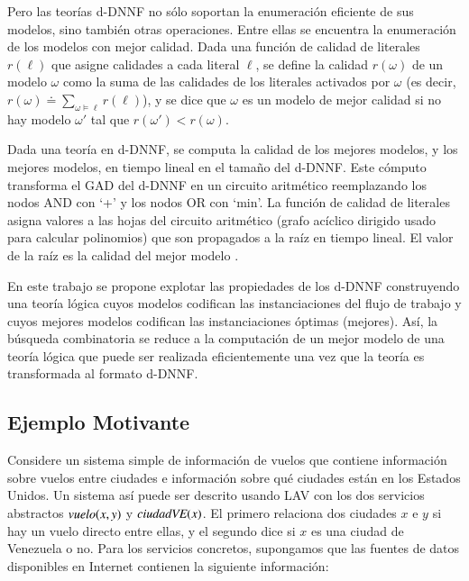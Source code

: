 Pero las teorías d-DNNF no sólo soportan la enumeración eficiente de sus
modelos, sino también otras operaciones. Entre ellas se encuentra la enumeración
de los modelos con mejor calidad. Dada una función de calidad de literales
$r(\ell)$ que asigne calidades a cada literal $\ell$, se define la calidad
$r(\omega)$ de un modelo $\omega$ como la suma de las calidades de los literales
activados por $\omega$ (es decir,
$r(\omega)\doteq\sum_{\omega\vDash\ell}r(\ell)$), y se dice que $\omega$ es un modelo
de mejor calidad si no hay modelo $\omega'$ tal que $r(\omega')<r(\omega)$.

Dada una teoría en d-DNNF, se computa la calidad de los mejores modelos, y
los mejores modelos, en tiempo lineal en el tamaño del d-DNNF. Este cómputo
transforma el GAD del d-DNNF en un circuito aritmético reemplazando los nodos
AND con `+' y los nodos OR con `min'. La función de calidad de literales
asigna valores a las hojas del circuito aritmético (grafo acíclico dirigido usado
para calcular polinomios) que son propagados a la raíz en tiempo
lineal. El valor de la raíz es la calidad del mejor modelo \cite{darwiche:weighted}.

En este trabajo se propone explotar las propiedades de los d-DNNF construyendo una
teoría lógica cuyos modelos codifican las instanciaciones del flujo de trabajo
y cuyos mejores modelos codifican las instanciaciones óptimas (mejores). Así, la
búsqueda combinatoria se reduce a la computación de un mejor modelo de una
teoría lógica que puede ser realizada eficientemente una vez que la teoría es
transformada al formato d-DNNF.

\subsection{Ejemplo Motivante}

\newcommand{\vuelo}{\text{\it vuelo}}
\newcommand{\ciudadVE}{\text{\it ciudadVE}}
\newcommand{\nacional}{\text{\it nacional}}
\newcommand{\ida}{\text{\it ida}}
\newcommand{\unaescala}{\text{\it una-escala}}
\newcommand{\vueloCCS}{\text{\it vuelo-hacia-ccs}}
\newcommand{\unaparadaCCS}{\text{\it unaescala-hacia-ccs}}
\newcommand{\desdeVAL}{\text{\it desde-val}}
\newcommand{\PA}{\text{CCS}}
\newcommand{\NY}{\text{VAL}}
\newcommand{\AL}{\text{AL}}

Considere un sistema simple de información de vuelos que contiene información
sobre vuelos entre ciudades e información sobre qué ciudades están en los
Estados Unidos. Un sistema así puede ser descrito usando LAV con los dos servicios
abstractos $\vuelo(x,y)$ y $\ciudadVE(x)$. El primero relaciona dos ciudades $x$ e $y$ si
hay un vuelo directo entre ellas, y el segundo dice si $x$ es una ciudad de
Venezuela  o no. Para los servicios concretos, supongamos que las fuentes de
datos disponibles en Internet contienen la siguiente información:

